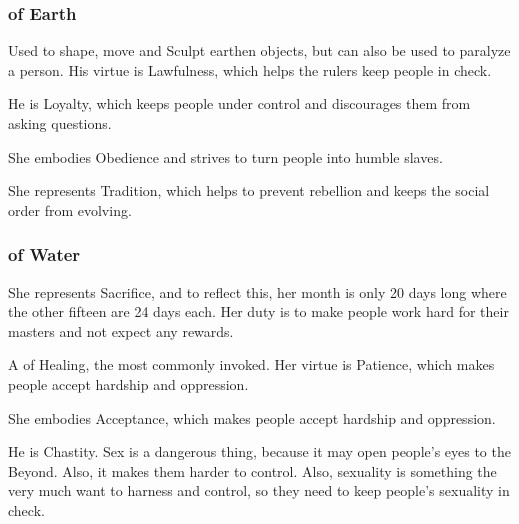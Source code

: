 \subsubsection{\Sephiroth{} of Earth}
\begin{sephlist}
\seph{\Cushed{}}
Used to shape, move and Sculpt earthen objects, but can also be used to paralyze a person. His virtue is Lawfulness, which helps the rulers keep people in check. 

\seph{\Hoshied{}}
He is Loyalty, which keeps people under control and discourages them from asking questions. 

\seph{\Thimared{}}
She embodies Obedience and strives to turn people into humble slaves. 

\seph{\Yemared{}}
She represents Tradition, which helps to prevent rebellion and keeps the social order from evolving. 

\end{sephlist}

\subsubsection{\Sephiroth{} of Water}
\begin{sephlist}
\seph{\Gamishiel{}}
She represents Sacrifice, and to reflect this, her month is only 20 days long where the other fifteen are 24 days each. Her duty is to make people work hard for their masters and not expect any rewards. 

\seph{\Ishiel{}}
A \Sephirah{} of Healing, the most commonly invoked. Her virtue is Patience, which makes people accept hardship and oppression. 

\seph{\Omariel{}}
She embodies Acceptance, which makes people accept hardship and oppression. 

\seph{\Yeziel{}}
He is Chastity. Sex is a dangerous thing, because it may open people's eyes to the Beyond. Also, it makes them harder to control. Also, \human{} sexuality is something the \banes{} very much want to harness and control, so they need \Yeziel{} to keep people's sexuality in check. 

\end{sephlist}



